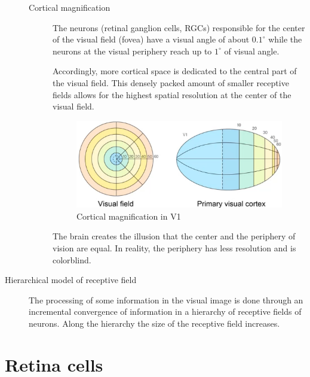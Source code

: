 \begin{description}
\begin{description}
            \item[Cortical magnification] 
                The neurons (retinal ganglion cells, RGCs) responsible for the center of the visual field (fovea)
                have a visual angle of about $0.1^\circ$ while the neurons at the visual periphery reach up to $1^\circ$ of visual angle.

                Accordingly, more cortical space is dedicated to the central part of the visual field.
                This densely packed amount of smaller receptive fields allows for the highest spatial resolution at the center of the visual field.

                \begin{figure}[H]
                    \centering
                    \includegraphics[width=0.4\linewidth]{./img/cortical_magnification.png}
                    \caption{Cortical magnification in V1}
                \end{figure}

                \begin{remark}
                    The brain creates the illusion that the center and the periphery of vision are equal.
                    In reality, the periphery has less resolution and is colorblind.
                \end{remark}
        \end{description}

    \item[Hierarchical model of receptive field]
        The processing of some information in the visual image is done through an incremental convergence of information
        in a hierarchy of receptive fields of neurons.
        Along the hierarchy the size of the receptive field increases.
\end{description}


\section{Retina cells}

